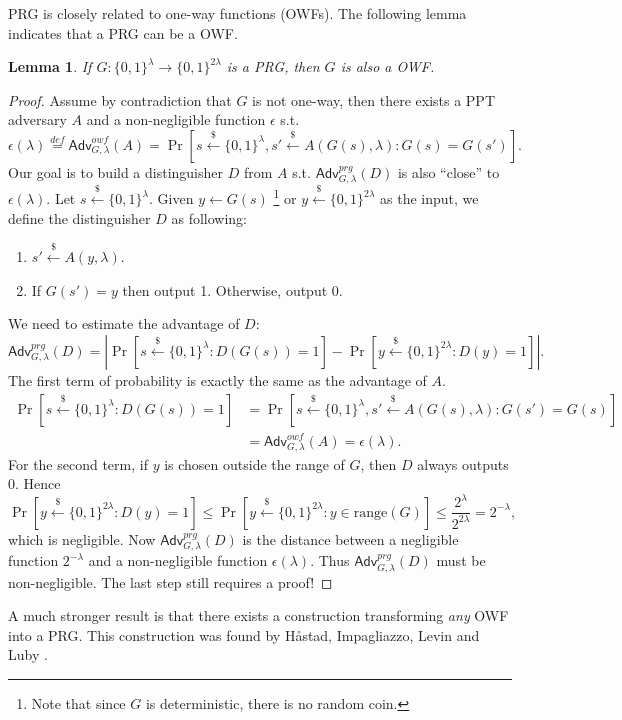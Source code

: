 \documentclass[12pt]{article}
\newcommand{\eqdef}{\stackrel{def}{=}}
\newcommand{\bits}{\{0,1\}}
\newcommand{\getsr}{\stackrel{\$}{\gets}}
\newcommand{\Adv}{\textsf{Adv}}
\newtheorem{lemma}[theorem]{Lemma}
\theoremstyle{definition}
\begin{document}
PRG is closely related to one-way functions (OWFs). The following lemma indicates that a PRG can be a OWF.
\begin{lemma}
If $G:\bits^\lambda \to \bits^{2\lambda}$ is a PRG, then $G$ is also a OWF.
\end{lemma}
\begin{proof}
Assume by contradiction that $G$ is not one-way, then there exists a PPT adversary $A$ and a non-negligible function $\epsilon$ s.t.
$$\epsilon(\lambda) \eqdef \Adv_{G,\lambda}^{owf}(A) =\Pr[s\getsr\bits^\lambda, s'\getsr A(G(s),\lambda): G(s)=G(s')].$$
Our goal is to build a distinguisher $D$ from $A$ s.t. $\Adv_{G,\lambda}^{prg}(D)$ is also ``close'' to $\epsilon(\lambda)$.
Let $s\getsr\bits^\lambda$. Given $y\gets G(s)$ \footnote{Note that since $G$ is deterministic, there is no random coin.} or $y\getsr \bits^{2\lambda}$ as the input, we define the distinguisher $D$ as following:
\begin{enumerate}
\item $s' \getsr A(y, \lambda)$.
\item If $G(s') = y$ then output 1. Otherwise, output 0.
\end{enumerate}
We need to estimate the advantage of $D$:
$$\Adv_{G,\lambda}^{prg}(D) = \left| \Pr[s\getsr \bits^\lambda : D(G(s))=1] - \Pr[y\getsr\bits^{2\lambda} : D(y)=1] \right|.$$
The first term of probability is exactly the same as the advantage of $A$.
\[
\begin{aligned}
\Pr[s\getsr\bits^\lambda : D(G(s))=1] &= \Pr[s\getsr\bits^\lambda, s'\getsr A(G(s),\lambda): G(s') = G(s)] \\
&= \Adv_{G,\lambda}^{owf}(A) = \epsilon(\lambda).
\end{aligned}
\]
For the second term, if $y$ is chosen outside the range of $G$, then $D$ always outputs 0. Hence
\[
\Pr[y\getsr\bits^{2\lambda} : D(y)=1] \leq \Pr[y\getsr\bits^{2\lambda} : y\in\mathrm{range}(G)] 
\leq \frac{2^\lambda}{2^{2\lambda}} = 2^{-\lambda},
\]
which is negligible. Now $\Adv_{G,\lambda}^{prg}(D)$ is the distance between a negligible function $2^{-\lambda}$ and a non-negligible function $\epsilon(\lambda)$. Thus $\Adv_{G,\lambda}^{prg}(D)$ must be non-negligible. The last step still requires a proof!
\end{proof}

A much stronger result is that there exists a construction transforming \emph{any} OWF into a PRG. This construction was found by H\aa stad, Impagliazzo, Levin and Luby \cite{HILL99}.
\end{document}
